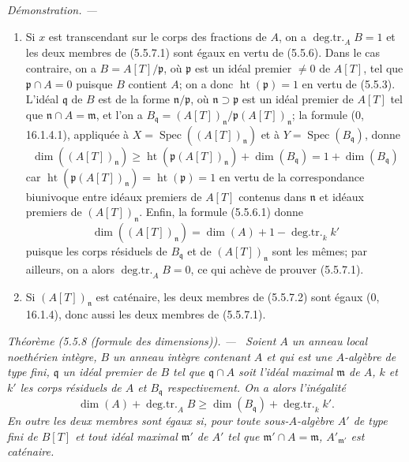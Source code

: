 \documentclass[10pt,oneside]{book}
\newenvironment{theorem}[1][]{%
  \par\medskip\noindent\itshape Théorème (#1). ---\ }{\par}
\newenvironment{proof}{%
  \par\medskip\noindent\textit{Démonstration. ---\ }}{\par}
\begin{document}
\begin{proof}
\begin{enumerate}
\item[(i)] Si $x$ est transcendant sur le corps des fractions de $A$, on a
$\operatorname{deg.tr.}_A B=1$ et les deux membres de (5.5.7.1) sont égaux en
vertu de (5.5.6). Dans le cas contraire, on a $B=A[T]/\mathfrak p$, où
$\mathfrak p$ est un idéal premier $\ne0$ de $A[T]$, tel que
$\mathfrak p\cap A=0$ puisque $B$ contient $A$; on a donc
$\operatorname{ht}(\mathfrak p)=1$ en vertu de (5.5.3). L'idéal
$\mathfrak q$ de $B$ est de la forme $\mathfrak n/\mathfrak p$, où
$\mathfrak n\supset\mathfrak p$ est un idéal premier de $A[T]$ tel que
$\mathfrak n\cap A=\mathfrak m$, et l'on a
$B_{\mathfrak q}=(A[T])_{\mathfrak n}/\mathfrak p(A[T])_{\mathfrak n}$;
la formule (0, 16.1.4.1), appliquée à
$X=\operatorname{Spec}((A[T])_{\mathfrak n})$ et à
$Y=\operatorname{Spec}(B_{\mathfrak q})$, donne
\begin{equation}
\dim((A[T])_{\mathfrak n})
\geq\operatorname{ht}(\mathfrak p(A[T])_{\mathfrak n})
+\dim(B_{\mathfrak q})=1+\dim(B_{\mathfrak q})
\tag{5.5.7.2}\label{IV.2.s5.5.7.2-fr}
\end{equation}
car $\operatorname{ht}(\mathfrak p(A[T])_{\mathfrak n})
=\operatorname{ht}(\mathfrak p)=1$ en vertu de la correspondance biunivoque
entre idéaux premiers de $A[T]$ contenus dans $\mathfrak n$ et idéaux
premiers de $(A[T])_{\mathfrak n}$. Enfin, la formule (5.5.6.1) donne
\begin{equation}
\dim((A[T])_{\mathfrak n})
=\dim(A)+1-\operatorname{deg.tr.}_k k'
\tag{5.5.7.3}\label{IV.2.s5.5.7.3-fr}
\end{equation}
puisque les corps résiduels de $B_{\mathfrak q}$ et de
$(A[T])_{\mathfrak n}$ sont les mêmes; par ailleurs, on a alors
$\operatorname{deg.tr.}_A B=0$, ce qui achève de prouver (5.5.7.1).
\item[(ii)] Si $(A[T])_{\mathfrak n}$ est caténaire, les deux membres de
(5.5.7.2) sont égaux (0, 16.1.4), donc aussi les deux membres de (5.5.7.1).
\end{enumerate}
\end{proof}

\begin{theorem}[5.5.8 (formule des dimensions)]
\label{IV.2.s5.5.8-fr}
Soient $A$ un anneau local noethérien intègre, $B$ un anneau intègre contenant
$A$ et qui est une $A$-algèbre de type fini, $\mathfrak q$ un idéal premier
de $B$ tel que $\mathfrak q\cap A$ soit l'idéal maximal $\mathfrak m$ de
$A$, $k$ et $k'$ les corps résiduels de $A$ et $B_{\mathfrak q}$
respectivement. On a alors l'inégalité
\begin{equation}
\dim(A)+\operatorname{deg.tr.}_A B
\geq\dim(B_{\mathfrak q})+\operatorname{deg.tr.}_k k'.
\tag{5.5.8.1}\label{IV.2.s5.5.8.1-fr}
\end{equation}
En outre les deux membres sont égaux si, pour toute sous-$A$-algèbre $A'$ de
type fini de $B[T]$ et tout idéal maximal $\mathfrak m'$ de $A'$ tel que
$\mathfrak m'\cap A=\mathfrak m$, $A'_{\mathfrak m'}$ est caténaire.
\end{theorem}
\end{document}
